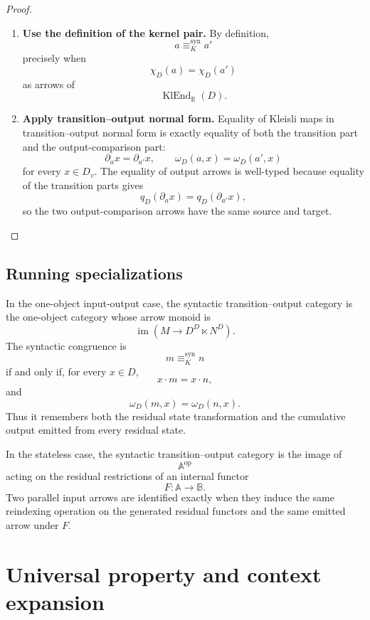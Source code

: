 \begin{proof}
    \leavevmode
    \begin{enumerate}
        \item \textbf{Use the definition of the kernel pair.}
        By definition,
        \[
            a\equiv_K^{\mathrm{syn}}a'
        \]
        precisely when
        \[
            \chi_D(a)=\chi_D(a')
        \]
        as arrows of
        \[
            \operatorname{KlEnd}_{\mathbb B}(D).
        \]

        \item \textbf{Apply transition--output normal form.}
        Equality of Kleisli maps in transition--output normal form is exactly
        equality of both the transition part and the output-comparison part:
        \[
            \partial_a x=\partial_{a'}x,
            \qquad
            \omega_D(a,x)=\omega_D(a',x)
        \]
        for every \(x\in D_v\). The equality of output arrows is well-typed
        because equality of the transition parts gives
        \[
            q_D(\partial_a x)=q_D(\partial_{a'}x),
        \]
        so the two output-comparison arrows have the same source and target.
    \end{enumerate}
\end{proof}

\subsection{Running specializations}
\label{subsec:syn-to-image-running-specializations}

In the one-object input-output case, the syntactic transition--output category
is the one-object category whose arrow monoid is
\[
    \operatorname{im}
    \left(
        M\to D^D\ltimes N^D
    \right).
\]
The syntactic congruence is
\[
    m\equiv_K^{\mathrm{syn}}n
\]
if and only if, for every \(x\in D\),
\[
    x\cdot m=x\cdot n,
\]
and
\[
    \omega_D(m,x)=\omega_D(n,x).
\]
Thus it remembers both the residual state transformation and the cumulative
output emitted from every residual state.

In the stateless case, the syntactic transition--output category is the image
of
\[
    \mathbb A^{\mathrm{op}}
\]
acting on the residual restrictions of an internal functor
\[
    F:\mathbb A\to\mathbb B.
\]
Two parallel input arrows are identified exactly when they induce the same
reindexing operation on the generated residual functors and the same emitted
arrow under \(F\).

\section{Universal property and context expansion}
\label{sec:syn-to-universal-property-context-expansion}

